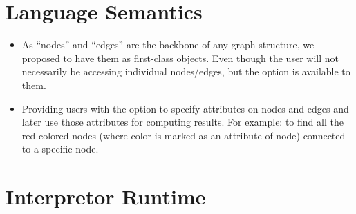 \documentclass[12,twoside]{article}
\begin{document}
\section{Language Semantics}
\begin{itemize}
   \item As ``nodes'' and ``edges'' are the backbone of any graph structure, we 
     proposed to have them as first-class objects. Even though the user will not 
     necessarily
  be accessing individual nodes/edges, but the option is available to them.
  \item Providing users with the option to specify attributes on nodes and edges 
  and later use
  those attributes for computing results. For example: to find all the red 
  colored nodes (where color is marked as an attribute of
      node) connected to a specific node.
\end{itemize}

\section{Interpretor Runtime}
\end{document}

